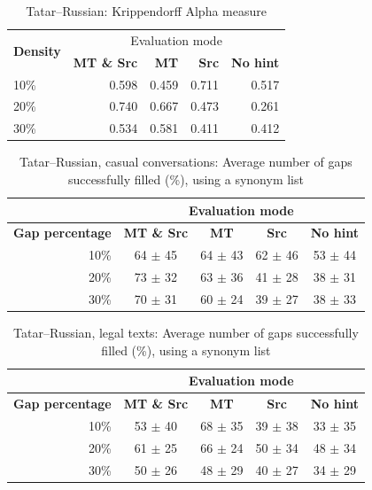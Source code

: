 \documentclass[11pt]{article}
\begin{document}
\begin{table}
\centering
  \begin{tabular}{|l|r|r|r|r|}
  \hline
 \multirow{2}{*}{\textbf{Density}} & \multicolumn{4}{|c|}{Evaluation mode} \\\cline{2-5}
                                            & \textbf{MT \& Src} & \textbf{MT} & \textbf{Src} & \textbf{No hint} \\
\hline
10\%&0.598&0.459 &0.711 &0.517 \\
20\%&0.740&0.667 &0.473 &0.261 \\
30\%&0.534&0.581 &0.411 &0.412 \\
\hline
\end{tabular}
\caption {Tatar--Russian: Krippendorff Alpha measure} 
\label{table:alpha-tat-rus}
\end{table}


\begin{table}

\centering
\begin{tabular}{|r |*{4}{c}|}
\hline
  &\multicolumn{4}{c|}{\textbf{Evaluation mode}}\\
\hline
\textbf{Gap percentage} & \textbf{MT \& Src} & \textbf{MT} & \textbf{Src} & \textbf{No hint} \\
\hline
10\%&64 \(\pm\) 45&64 \(\pm\) 43&62 \(\pm\) 46&53 \(\pm\) 44\\
20\%&73 \(\pm\) 32&63 \(\pm\) 36&41 \(\pm\) 28&38 \(\pm\) 31\\
30\%&70 \(\pm\) 31&60 \(\pm\) 24&39 \(\pm\) 27&38 \(\pm\) 33\\
\hline
\end{tabular}
\caption {Tatar--Russian, casual conversations: Average number of gaps successfully filled (\%), using a synonym list} 
\label{table:rus-casual} 
\end{table}

\begin{table}
\centering
\begin{tabular}{|r |*{4}{c}|}
\hline
  &\multicolumn{4}{c|}{\textbf{Evaluation mode}}\\
\hline
\textbf{Gap percentage} & \textbf{MT \& Src} & \textbf{MT} & \textbf{Src} & \textbf{No hint} \\
\hline
10\%&53 \(\pm\) 40&68 \(\pm\) 35&39 \(\pm\) 38&33 \(\pm\) 35\\
20\%&61 \(\pm\) 25&66 \(\pm\) 24&50 \(\pm\) 34&48 \(\pm\) 34\\
30\%&50 \(\pm\) 26&48 \(\pm\) 29&40 \(\pm\) 27&34 \(\pm\) 29\\
\hline
\end{tabular}
\caption {Tatar--Russian, legal texts: Average number of gaps successfully filled (\%), using a synonym list} \label{table:rus-legal} 
\end{table}
\end{document}
